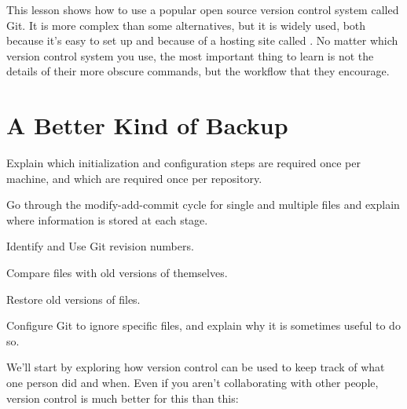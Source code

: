 \documentclass{book}
\begin{document}
This lesson shows how to use a popular open source version control
system called Git. It is more complex than some alternatives, but it is
widely used, both because it's easy to set up and because of a hosting
site called . No matter which version
control system you use, the most important thing to learn is not the
details of their more obscure commands, but the workflow that they
encourage.

\section{A Better Kind of Backup}

\begin{objectives}
\begin{swcitemize}
\item
  Explain which initialization and configuration steps are required once
  per machine, and which are required once per repository.
\item
  Go through the modify-add-commit cycle for single and multiple files
  and explain where information is stored at each stage.
\item
  Identify and Use Git revision numbers.
\item
  Compare files with old versions of themselves.
\item
  Restore old versions of files.
\item
  Configure Git to ignore specific files, and explain why it is
  sometimes useful to do so.
\end{swcitemize}
\end{objectives}

We'll start by exploring how version control can be used to keep track
of what one person did and when. Even if you aren't collaborating with
other people, version control is much better for this than this:
\end{document}
